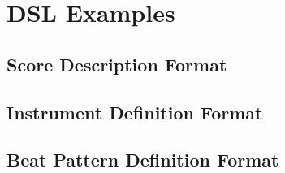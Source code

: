 \chapter{DSL Examples}
\label{appendix:dsl_samples}

\section{Score Description Format}



\section{Instrument Definition Format}



\section{Beat Pattern Definition Format}

